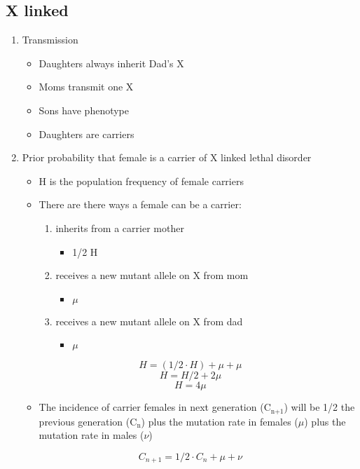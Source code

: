\documentclass{scrartcl}
\begin{document}
\subsection{X linked}
\label{sec:org9e177ff}
\begin{enumerate}
\item Transmission
\label{sec:org808c9ec}
\begin{itemize}
\item Daughters always inherit Dad's X
\item Moms transmit one X
\item Sons have phenotype
\item Daughters are carriers
\end{itemize}

\item Prior probability that female is a carrier of X linked lethal disorder
\label{sec:orgcf37bc2}
\begin{itemize}
\item H is the population frequency of female carriers
\item There are there ways a female can be a carrier:
\begin{enumerate}
\item inherits from a carrier mother
\begin{itemize}
\item 1/2  H
\end{itemize}
\item receives a new mutant allele on X from mom
\begin{itemize}
\item \(\mu\)
\end{itemize}
\item receives a new mutant allele on X from dad
\begin{itemize}
\item \(\mu\)
\end{itemize}
\end{enumerate}
\end{itemize}
\[H = (1/2 \cdot H) + \mu + \mu \]
\[H = H/2 +2\mu \]
\[H = 4\mu \]

\begin{itemize}
\item The incidence of carrier females in next generation (C\(_{\text{n+1}}\)) will
be 1/2 the previous generation (C\(_{\text{n}}\)) plus the mutation rate in
females (\(\mu\)) plus the mutation rate in males (\(\nu\))
\end{itemize}

\[C_{n+1} = 1/2 \cdot C_n + \mu + \nu \]


\end{enumerate}
\end{document}
